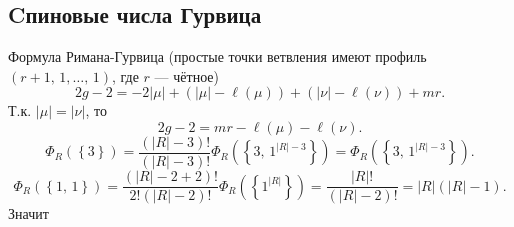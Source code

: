 \documentclass[a4paper,14pt]{extarticle}
\numberwithin{equation}{section}
\begin{document}
\subsection{Cпиновые числа Гурвица}
Формула Римана-Гурвица (простые точки ветвления имеют профиль $(r+1,\,1,\ldots,\,1)$, где $r$ --- чётное)
\[
	2g-2=-2|\mu|+\left( |\mu|-\ell\left(\mu\right) \right) +
	\left( |\nu|-\ell\left(\nu\right) \right)+m r 
.\] 
Т.\:к. $|\mu|=|\nu|$, то
 \[
	 2g-2=mr- \ell(\mu)- \ell(\nu)
.\] 
\[
	\Phi_R(\left\{ 3 \right\} )= 
	\frac{\left( |R|-3 \right) !}{\left( |R|-3 \right) !}\Phi_{R}\left( \left\{ 3,\,1^{|R|-3} \right\}  \right) =\Phi_R\left( \left\{ 3,\,1^{|R|-3} \right\}  \right) 
.\] 
\[
	\Phi_R\left( \left\{ 1,\,1 \right\}  \right) =
	\frac{\left( |R|-2+2 \right) !}{2!\left( |R|-2 \right) !}\Phi_{R}\left( \left\{ 1^{|R|} \right\}  \right)=
	\frac{|R|!}{ (|R|-2)!}=|R|\left(|R|-1\right)
.\] 
Значит
\end{document}
